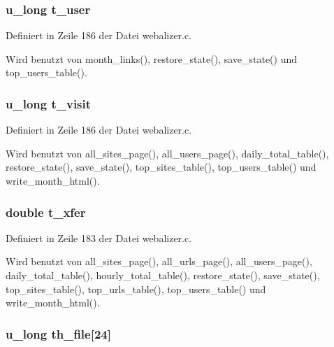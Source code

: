 \subsubsection{\setlength{\rightskip}{0pt plus 5cm}u\_\-long {\bf t\_\-user}}\label{webalizer_8h_196ee522ca1e09cef5b8962a7c63e4e2}




Definiert in Zeile 186 der Datei webalizer.c.

Wird benutzt von month\_\-links(), restore\_\-state(), save\_\-state() und top\_\-users\_\-table().
\subsubsection{\setlength{\rightskip}{0pt plus 5cm}u\_\-long {\bf t\_\-visit}}\label{webalizer_8h_241257c2fb7477a7dc9191c01e8a155a}




Definiert in Zeile 186 der Datei webalizer.c.

Wird benutzt von all\_\-sites\_\-page(), all\_\-users\_\-page(), daily\_\-total\_\-table(), restore\_\-state(), save\_\-state(), top\_\-sites\_\-table(), top\_\-users\_\-table() und write\_\-month\_\-html().
\subsubsection{\setlength{\rightskip}{0pt plus 5cm}double {\bf t\_\-xfer}}\label{webalizer_8h_1952e11824da591d81fdf3371627ae86}




Definiert in Zeile 183 der Datei webalizer.c.

Wird benutzt von all\_\-sites\_\-page(), all\_\-urls\_\-page(), all\_\-users\_\-page(), daily\_\-total\_\-table(), hourly\_\-total\_\-table(), restore\_\-state(), save\_\-state(), top\_\-sites\_\-table(), top\_\-urls\_\-table(), top\_\-users\_\-table() und write\_\-month\_\-html().
\subsubsection{\setlength{\rightskip}{0pt plus 5cm}u\_\-long {\bf th\_\-file}[24]}\label{webalizer_8h_8d6ce1fa8aba3c7f1ed1c7e19ea0541c}




